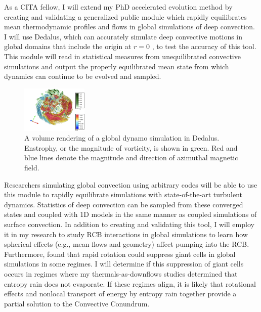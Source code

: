 \documentclass[preprint, hmargin=1in, vmargin=1in]{aastex62}
\begin{document}
As a CITA fellow, I will extend my PhD accelerated evolution method \citep{anders&all2018} by creating and validating a generalized public module which rapidly equilibrates mean thermodynamic profiles and flows in global simulations of deep convection.
I will use Dedalus, which can accurately simulate deep convective motions in global domains that include the origin at $r = 0$ \citep[as visualized in Fig.~\ref{fig:mdwarf}, and tested in][]{lecoanet&all2019}, to test the accuracy of this tool.
This module will read in statistical measures from unequilibrated convective simulations and output the properly equilibrated mean state from which dynamics can continue to be evolved and sampled.
\begin{figure}
	\begin{center}
	\vspace{-16pt}
    \includegraphics[width=0.28\textwidth]{./figs/mdwarf.png}
	\vspace{-16pt}
	\end{center}
    \caption{A volume rendering of a global dynamo simulation in Dedalus.
	Enstrophy, or the magnitude of vorticity, is shown in green.
	Red and blue lines denote the magnitude and direction of azimuthal magnetic field.
	\label{fig:mdwarf} }
	\vspace{-16pt}
\end{figure}
Researchers simulating global convection using arbitrary codes will be able to use this module to rapidly equilibrate simulations with state-of-the-art turbulent dynamics.
Statistics of deep convection can be sampled from these converged states and coupled with 1D models in the same manner as \citet{jorgensen&weiss2019} coupled simulations of surface convection.
In addition to creating and validating this tool, I will employ it in my research to study RCB interactions in global simulations to learn how spherical effects (e.g., mean flows and geometry) affect pumping into the RCB.
Furthermore, \citet{featherstone&hindman2016} found that rapid rotation could suppress giant cells in global simulations in some regimes.
I will determine if this suppression of giant cells occurs in regimes where my thermals-as-downflows studies determined that entropy rain does not evaporate.
If these regimes align, it is likely that rotational effects and nonlocal transport of energy by entropy rain together provide a partial solution to the Convective Conundrum.
\end{document}
